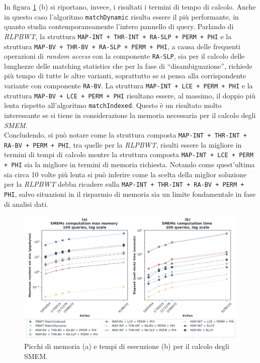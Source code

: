 In figura \ref{fig:smemtimememchr} (b) si riportano, invece, i risultati i
termini di tempo di calcolo. Anche in questo caso l'algoritmo
\texttt{matchDynamic} risulta essere il più performante, in quanto studia
contemporaneamente l'intero pannello di query. Parlando di \textit{RLPBWT},  la
struttura \texttt{MAP-INT + THR-INT + RA-SLP + PERM + PHI} e la 
struttura 
\texttt{MAP-BV + THR-BV + RA-SLP + PERM + PHI}, a causa delle
frequenti operazioni di \textit{random access} con la componente
\texttt{RA-SLP}, sia per il calcolo delle lunghezze delle 
matching statistics che per la fase di ``disambiguazione'', richiede più tempo
di tutte le altre varianti, soprattutto se si pensa alla corrispondente
variante con componente \texttt{RA-BV}. La struttura \texttt{MAP-INT + LCE +
  PERM + PHI} e la struttura 
\texttt{MAP-BV + LCE + PERM + PHI} risultano essere, al massimo,
il doppio più lenta rispetto all'algoritmo \texttt{matchIndexed}. Questo è un
risultato molto interessante se si tiene in considerazione la memoria necessaria
per il calcolo degli \textit{SMEM}.\\
Concludendo, si può  notare come la struttura composta
\texttt{MAP-INT + THR-INT + RA-BV + PERM + PHI}, tra quelle per la
\textit{RLPBWT}, risulti essere la migliore in termini di tempi di calcolo
mentre la struttura composta \texttt{MAP-INT + LCE + PERM + PHI} sia la
migliore in termini di memoria richiesta. Notando come quest'ultima sia circa 10
volte più lenta si può inferire come la scelta della miglior soluzione per la
\textit{RLPBWT} debba ricadere sulla \texttt{MAP-INT + THR-INT + RA-BV + PERM +
  PHI}, salvo situazioni in il risparmio di memoria sia un limite fondamentale
in fase di analisi dati. 
\begin{figure}
  \centering
  \includegraphics[width=\linewidth]{img/exe_time_mem_paper}
  \caption{Picchi di memoria (a) e tempi di esecuzione (b) per il calcolo degli
    SMEM.}
  \label{fig:smemtimememchr}
\end{figure}
